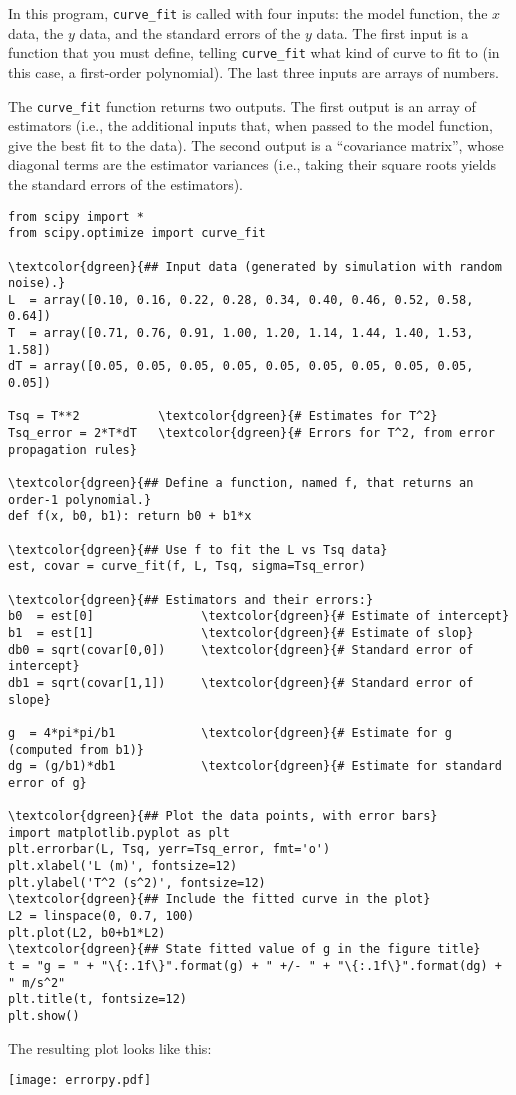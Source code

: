 \documentclass[11pt,a4paper]{article}
\begin{document}
In this program, \texttt{curve\_fit} is called with four inputs: the
model function, the $x$ data, the $y$ data, and the standard errors of
the $y$ data.  The first input is a function that you must define,
telling \texttt{curve\_fit} what kind of curve to fit to (in this
case, a first-order polynomial).  The last three inputs are arrays of
numbers.

The \texttt{curve\_fit} function returns two outputs.  The first
output is an array of estimators (i.e., the additional inputs that,
when passed to the model function, give the best fit to the data).
The second output is a ``covariance matrix'', whose diagonal terms are
the estimator variances (i.e., taking their square roots yields the
standard errors of the estimators).

\begin{Verbatim}[frame=single,baselinestretch=1,fontsize=\small,commandchars=\\\{\}]
from scipy import *
from scipy.optimize import curve_fit

\textcolor{dgreen}{## Input data (generated by simulation with random noise).}
L  = array([0.10, 0.16, 0.22, 0.28, 0.34, 0.40, 0.46, 0.52, 0.58, 0.64])
T  = array([0.71, 0.76, 0.91, 1.00, 1.20, 1.14, 1.44, 1.40, 1.53, 1.58])
dT = array([0.05, 0.05, 0.05, 0.05, 0.05, 0.05, 0.05, 0.05, 0.05, 0.05])

Tsq = T**2           \textcolor{dgreen}{# Estimates for T^2}
Tsq_error = 2*T*dT   \textcolor{dgreen}{# Errors for T^2, from error propagation rules}

\textcolor{dgreen}{## Define a function, named f, that returns an order-1 polynomial.}
def f(x, b0, b1): return b0 + b1*x

\textcolor{dgreen}{## Use f to fit the L vs Tsq data}
est, covar = curve_fit(f, L, Tsq, sigma=Tsq_error)

\textcolor{dgreen}{## Estimators and their errors:}
b0  = est[0]               \textcolor{dgreen}{# Estimate of intercept}
b1  = est[1]               \textcolor{dgreen}{# Estimate of slop}
db0 = sqrt(covar[0,0])     \textcolor{dgreen}{# Standard error of intercept}
db1 = sqrt(covar[1,1])     \textcolor{dgreen}{# Standard error of slope}

g  = 4*pi*pi/b1            \textcolor{dgreen}{# Estimate for g (computed from b1)}
dg = (g/b1)*db1            \textcolor{dgreen}{# Estimate for standard error of g}

\textcolor{dgreen}{## Plot the data points, with error bars}
import matplotlib.pyplot as plt
plt.errorbar(L, Tsq, yerr=Tsq_error, fmt='o')
plt.xlabel('L (m)', fontsize=12)
plt.ylabel('T^2 (s^2)', fontsize=12)
\textcolor{dgreen}{## Include the fitted curve in the plot}
L2 = linspace(0, 0.7, 100)
plt.plot(L2, b0+b1*L2)
\textcolor{dgreen}{## State fitted value of g in the figure title}
t = "g = " + "\{:.1f\}".format(g) + " +/- " + "\{:.1f\}".format(dg) + " m/s^2"
plt.title(t, fontsize=12)
plt.show()
\end{Verbatim}
The resulting plot looks like this:
\begin{center}
  \texttt{[image: errorpy.pdf]}
\end{center}
\end{document}
